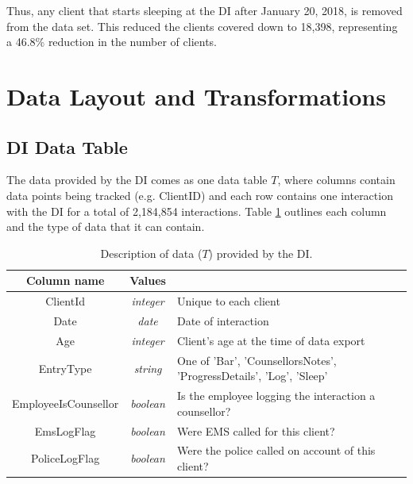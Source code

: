 
Thus, any client that starts sleeping at the DI after January 20, 2018, is removed from the data set.
This reduced the clients covered down to 18,398, representing a 46.8\% reduction in the number of clients.



\section{Data Layout and Transformations} \label{chap:data:layout}


\subsection{DI Data Table}


The data provided by the DI comes as one data table $T$, where columns contain data points being tracked (e.g. ClientID) and each row contains one interaction with the DI for a total of 2,184,854 interactions. Table \ref{tbl:university} outlines each column and the type of data that it can contain.


\begin{table}[h!]
	\begin{tabular}{ c c p{} } 
		\toprule
		Column name & Values &  \\
		\midrule
		ClientId & \emph{integer} & Unique to each client \\
		Date & \emph{date} & Date of interaction \\
		Age & \emph{integer} & Client's age at the time of data export \\
		EntryType & \emph{string} & One of 'Bar', 'CounsellorsNotes', 'ProgressDetails', 'Log', 'Sleep' \\
		EmployeeIsCounsellor & \emph{boolean} & Is the employee logging the interaction a counsellor? \\
		EmsLogFlag & \emph{boolean} & Were EMS called for this client? \\
		PoliceLogFlag & \emph{boolean} & Were the police called on account of this client? \\
		\bottomrule
	\end{tabular}
	\caption{Description of data ($T$) provided by the DI.}
	\label{tbl:university}
\end{table}


